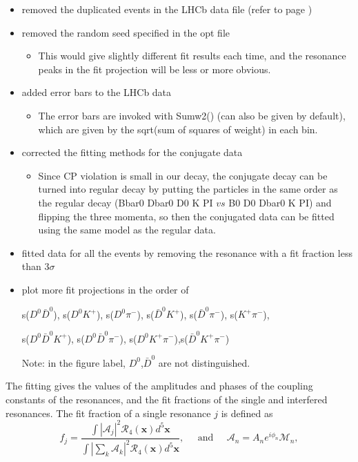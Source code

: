 \begin{itemize}
    \item removed the duplicated events in the LHCb data file (refer to page \pageref{rm_dup})
    \item removed the random seed specified in the opt file
    \begin{itemize}
        \item This would give slightly different fit results each time, and the resonance peaks in the fit projection will be less or more obvious.
    \end{itemize}
    \item added error bars to the LHCb data 
    \begin{itemize}
        \item The error bars are invoked with Sumw2() (can also be given by default), which are given by the sqrt(sum of squares of weight) in each bin.
    \end{itemize}
    \item corrected the fitting methods for the conjugate data 
    \begin{itemize}
        \item Since CP violation is small in our decay, the conjugate decay can be turned into regular decay by putting the particles in the same order as the regular decay (Bbar0 Dbar0 D0 K PI $vs$ B0 D0 Dbar0 K PI) and flipping the three momenta, so then the conjugated data can be fitted using the same model as the regular data.
    \end{itemize}
    \item fitted data for all the events by removing the resonance with a fit fraction less than 3$\sigma$
    \item plot more fit projections in the order of
    
    s($D^0\bar{D}^0$), s($D^0K^+$), s($D^0\pi^-$), s($\bar{D}^0K^+$), s($\bar{D}^0\pi^-$), s($K^+\pi^-$), 
    
    s($D^0\bar{D}^0K^+$), s($D^0\bar{D}^0\pi^-$), s($D^0K^+\pi^-$),s($\bar{D}^0K^+\pi^-$)
    
    Note: in the figure label, $D^0$,$\bar{D}^0$ are not distinguished.
    \\
\end{itemize}
The fitting gives the values of the amplitudes and phases of the coupling constants of the resonances, and the fit fractions of the single and interfered resonances. The fit fraction of a single resonance $j$ is defined as 
\begin{equation}
    f_j = \frac{\int|\mathcal{A}_j|^2 \mathcal{R}_4(\bm{x})d^5\bm{x}}{\int|\sum_k\mathcal{A}_k|^2\mathcal{R}_4(\bm{x})d^5\bm{x}},\;\;\;\;\;\text{and}\;\;\;\;\;\mathcal{A}_n = A_n e^{i\phi_n} \mathcal{M}_n,
\end{equation}
